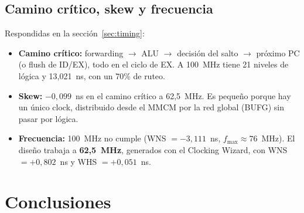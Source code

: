 \documentclass[12pt,a4paper]{article}
\begin{document}
\subsection{Camino crítico, skew y frecuencia}

Respondidas en la sección~\ref{sec:timing}:
\begin{itemize}[nosep]
  \item \textbf{Camino crítico:} forwarding $\rightarrow$ ALU $\rightarrow$
        decisión del salto $\rightarrow$ próximo PC (o flush de ID/EX), todo en
        el ciclo de EX. A 100~MHz tiene 21 niveles de lógica y 13,021~ns, con un
        70\% de ruteo.
  \item \textbf{Skew:} $-0{,}099$~ns en el camino crítico a 62,5~MHz. Es
        pequeño porque hay un único clock, distribuido desde el MMCM por la red
        global (BUFG) sin pasar por lógica.
  \item \textbf{Frecuencia:} 100~MHz no cumple (WNS $= -3{,}111$~ns,
        $f_{\max} \approx 76$~MHz). El diseño trabaja a \textbf{62,5~MHz},
        generados con el Clocking Wizard, con WNS $= +0{,}802$~ns y WHS
        $= +0{,}051$~ns.
\end{itemize}

\section{Conclusiones}
\end{document}
